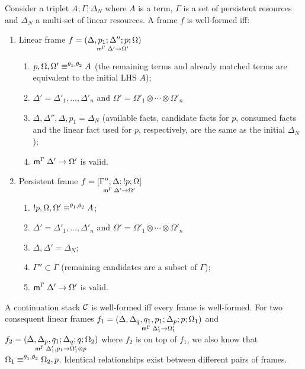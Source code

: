\begin{definition}

Consider a triplet $A; \Gamma; \Delta_{N}$ where $A$ is a term, $\Gamma$ is a
set of persistent resources and $\Delta_{N}$ a multi-set of linear
resources. A frame $f$ is well-formed iff:

\begin{enumerate}[leftmargin=*]
   \item Linear frame $f = \lframe{\Delta,
      p_1}{\Delta''}{p}{\Omega}{\Delta'}{\Omega'}$

   \begin{enumerate}
      \item $\feq{p, \Omega, \Omega'}{A}$ (the remaining terms and already
               matched terms are equivalent to the initial LHS $A$);
      \item $\Delta' = \Delta'_1, \dotsc, \Delta'_n$ and $\Omega' =
      \Omega'_1 \otimes \dotsb \otimes \Omega'_n$
      \item $\Delta, \Delta'', \Delta, p_1 = \Delta_{N}$ (available facts, candidate
            facts for $p$, consumed facts and the linear fact used for $p$,
            respectively, are the same as the initial $\Delta_{N}$);
      \item $\mz{\Gamma}{\Delta'}{\Omega'}$ is valid.

   \end{enumerate}
   \item Persistent frame $f = \pframe{\Gamma''}{\Delta}{\bang
   p}{\Omega}{\Delta'}{\Omega'}$
      \begin{enumerate}
         \item $\feq{\bang p, \Omega, \Omega'}{A}$;
         \item $\Delta' = \Delta'_1, \dotsc, \Delta'_n$ and $\Omega' =
         \Omega'_1 \otimes \dotsb \otimes \Omega'_n$
         \item $\Delta, \Delta' = \Delta_{N}$;
         \item $\Gamma'' \subset \Gamma$ (remaining candidates are a subset of
                     $\Gamma$);
         \item $\mz{\Gamma}{\Delta'}{\Omega'}$ is valid.
      \end{enumerate}
\end{enumerate}
\end{definition}


\begin{definition}
A continuation stack $\lstack{C}$ is well-formed iff every frame is well-formed.
For two consequent linear frames $f_1 = \lframe{\Delta, \Delta_q, q_1,
p_1}{\Delta_p}{p}{\Omega_1}{\Delta'_1}{\Omega'_1}$ and $f_2 = \lframe{\Delta,
\Delta_p, q_1}{\Delta_q}{q}{\Omega_2}{\Delta'_1, p_1}{\Omega'_1 \otimes p}$
where $f_2$ is on top of $f_1$, we also know that $\feq{\Omega_1}{\Omega_2, p}$.
Identical relationships exist between different pairs of frames.
\end{definition}

